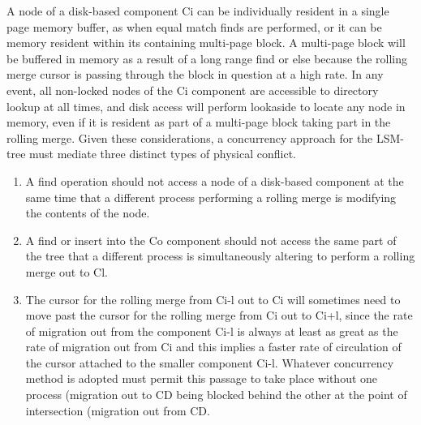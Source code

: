 \documentclass[a4paper,11pt,notitlepage,twoside,openright]{article}
\begin{document}
A node of a disk-based component Ci can be individually resident in a
single page memory buffer, as when equal match finds are performed, or
it can be memory resident within its containing multi-page block. A
multi-page block will be buffered in memory as a result of a long range
find or else because the rolling merge cursor is passing through the
block in question at a high rate. In any event, all non-locked nodes of
the Ci component are accessible to directory lookup at all times, and
disk access will perform lookaside to locate any node in memory, even if
it is resident as part of a multi-page block taking part in the rolling
merge. Given these considerations, a concurrency approach for the
LSM-tree must mediate three distinct types of physical conflict.


\begin{enumerate}
\def\labelenumi{\roman{enumi}.}
\item
  A find operation should not access a node of a disk-based component at
  the same time that a different process performing a rolling merge is
  modifying the contents of the node.
\item
  A find or insert into the Co component should not access the same part
  of the tree that a different process is simultaneously altering to
  perform a rolling merge out to Cl.
\item
  The cursor for the rolling merge from Ci-l out to Ci will sometimes
  need to move past the cursor for the rolling merge from Ci out to
  Ci+l, since the rate of migration out from the component Ci-l is
  always at least as great as the rate of migration out from Ci and this
  implies a faster rate of circulation of the cursor attached to the
  smaller component Ci-l. Whatever concurrency method is adopted must
  permit this passage to take place without one process (migration out
  to CD being blocked behind the other at the point of intersection
  (migration out from CD.
\end{enumerate}
\end{document}

